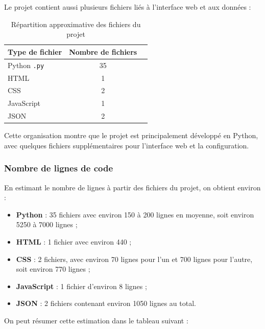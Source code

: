 \documentclass[a4paper]{article}
\begin{document}
Le projet contient aussi plusieurs fichiers liés à l'interface web et aux données :

\begin{table}[h]
    \centering
    \begin{tabular}{|l|c|l|}
        \hline
        \textbf{Type de fichier} & \textbf{Nombre de fichiers} \\
        \hline
        Python \texttt{.py} & 35  \\
        \hline
        HTML & 1  \\
        \hline
        CSS & 2  \\
        \hline
        JavaScript & 1  \\
        \hline
        JSON & 2  \\
        \hline
    \end{tabular}
    \caption{Répartition approximative des fichiers du projet}
    \label{tab:stats-fichiers}
\end{table}

Cette organisation montre que le projet est principalement développé en Python, avec quelques fichiers supplémentaires pour l'interface web et la configuration.

\subsubsection{Nombre de lignes de code}

En estimant le nombre de lignes à partir des fichiers du projet, on obtient environ :

\begin{itemize}
    \item \textbf{Python} : 35 fichiers avec environ 150 à 200 lignes en moyenne, soit environ 5250 à 7000 lignes ;
    \item \textbf{HTML} : 1 fichier avec environ 440  ;
    \item \textbf{CSS} : 2 fichiers, avec environ 70 lignes pour l'un et 700 lignes pour l'autre, soit environ 770 lignes ;
    \item \textbf{JavaScript} : 1 fichier d'environ 8 lignes ;
    \item \textbf{JSON} : 2 fichiers contenant environ 1050 lignes au total.
\end{itemize}

On peut résumer cette estimation dans le tableau suivant :
\end{document}

